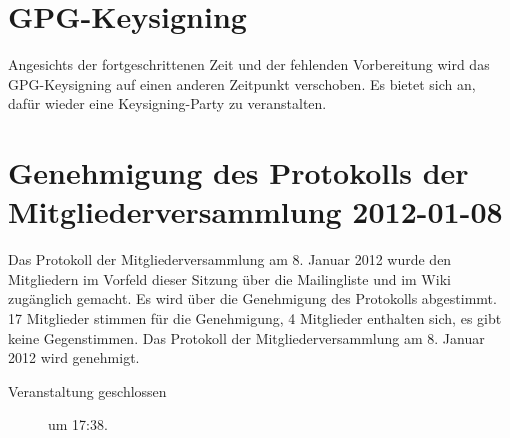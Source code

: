 \documentclass[a4paper,12pt]{scrartcl}
\begin{document}
\section{GPG-Keysigning}
\postponed
Angesichts der fortgeschrittenen Zeit und der fehlenden Vorbereitung wird das
GPG-Keysigning auf einen anderen Zeitpunkt verschoben. Es bietet sich an, dafür
wieder eine Keysigning-Party zu veranstalten.

\section{Genehmigung des Protokolls der Mitgliederversammlung 2012-01-08}
Das Protokoll der Mitgliederversammlung am 8. Januar 2012 wurde den Mitgliedern
im Vorfeld dieser Sitzung über die Mailingliste und im Wiki zugänglich gemacht.
Es wird über die Genehmigung des Protokolls abgestimmt. 17 Mitglieder stimmen
für die Genehmigung, 4 Mitglieder enthalten sich, es gibt keine Gegenstimmen.
Das Protokoll der Mitgliederversammlung am 8. Januar 2012 wird genehmigt.

\begin{description}
  \item[Veranstaltung geschlossen] um 17:38.
\end{description}

\appendix

\cleardoublepage
\end{document}
